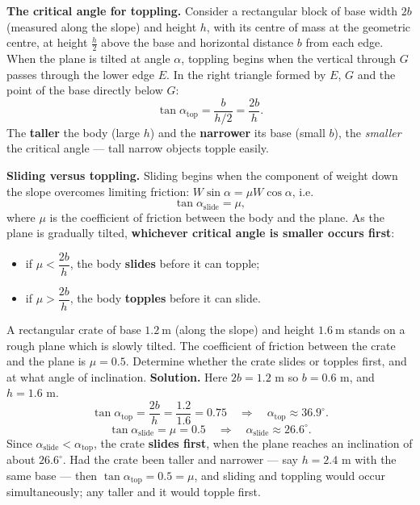 \documentclass[11pt]{article}
\begin{document}
\textbf{The critical angle for toppling.} Consider a rectangular block of base width $2b$ (measured along the slope) and height $h$, with its centre of mass at the geometric centre, at height $\tfrac{h}{2}$ above the base and horizontal distance $b$ from each edge. When the plane is tilted at angle $\alpha$, toppling begins when the vertical through $G$ passes through the lower edge $E$. In the right triangle formed by $E$, $G$ and the point of the base directly below $G$:
\[ \tan\alpha_{\text{top}} = \frac{b}{h/2} = \frac{2b}{h}. \]
The \textbf{taller} the body (large $h$) and the \textbf{narrower} its base (small $b$), the \emph{smaller} the critical angle — tall narrow objects topple easily.

\textbf{Sliding versus toppling.} Sliding begins when the component of weight down the slope overcomes limiting friction: $W\sin\alpha = \mu W\cos\alpha$, i.e.
\[ \tan\alpha_{\text{slide}} = \mu, \]
where $\mu$ is the coefficient of friction between the body and the plane. As the plane is gradually tilted, \textbf{whichever critical angle is smaller occurs first}:
\begin{itemize}
\item if $\mu < \dfrac{2b}{h}$, the body \textbf{slides} before it can topple;
\item if $\mu > \dfrac{2b}{h}$, the body \textbf{topples} before it can slide.
\end{itemize}

\begin{exoresolu}
A rectangular crate of base $1.2\ \mathrm{m}$ (along the slope) and height $1.6\ \mathrm{m}$ stands on a rough plane which is slowly tilted. The coefficient of friction between the crate and the plane is $\mu = 0.5$. Determine whether the crate slides or topples first, and at what angle of inclination.
\tcblower
\textbf{Solution.} Here $2b = 1.2$ m so $b = 0.6$ m, and $h = 1.6$ m.
\[ \tan\alpha_{\text{top}} = \frac{2b}{h} = \frac{1.2}{1.6} = 0.75 \quad\Rightarrow\quad \alpha_{\text{top}} \approx 36.9^{\circ}. \]
\[ \tan\alpha_{\text{slide}} = \mu = 0.5 \quad\Rightarrow\quad \alpha_{\text{slide}} \approx 26.6^{\circ}. \]
Since $\alpha_{\text{slide}} < \alpha_{\text{top}}$, the crate \textbf{slides first}, when the plane reaches an inclination of about $26.6^{\circ}$. Had the crate been taller and narrower — say $h = 2.4$ m with the same base — then $\tan\alpha_{\text{top}} = 0.5 = \mu$, and sliding and toppling would occur simultaneously; any taller and it would topple first.
\end{exoresolu}
\end{document}
